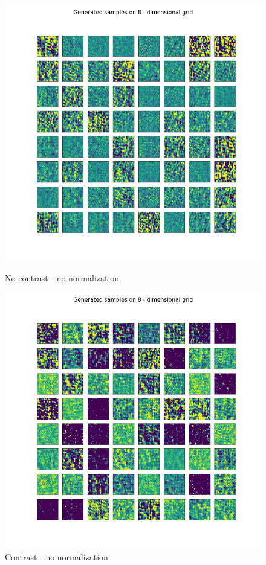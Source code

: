 \documentclass[12pt, english]{article}
\begin{document}
\begin{figure}[H] 
  \begin{minipage}[b]{0.5\linewidth}
    \centering
    \includegraphics[width=.75\linewidth]{contrast/generated_samples_noContrastNorm_noContrast.png} 
    \caption{No contrast - no normalization} 
    \label{fig:contrast-generated-1} 
  \end{minipage}%
  \begin{minipage}[b]{0.5\linewidth}
    \centering
    \includegraphics[width=.75\linewidth]{contrast/generated_samples_noContrastNorm_contrast.png} 
    \caption{Contrast - no normalization} 
    \label{fig:contrast-generated-2} 
  \end{minipage} 
  \begin{minipage}[b]{0.5\linewidth}

\end{minipage}
\end{figure}
\end{document}
